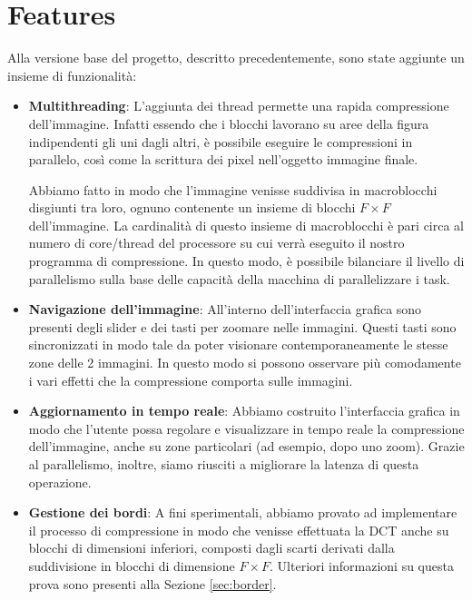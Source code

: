 \section{Features}

Alla versione base del progetto, descritto precedentemente, sono state aggiunte un insieme di funzionalità:

\begin{itemize}
	\item \textbf{Multithreading}: L'aggiunta dei thread permette una rapida compressione dell'immagine. Infatti essendo che i blocchi lavorano su aree della figura indipendenti gli uni dagli altri, è possibile eseguire le compressioni in parallelo, così come la scrittura dei pixel nell'oggetto immagine finale.
	
	Abbiamo fatto in modo che l'immagine venisse suddivisa in macroblocchi disgiunti tra loro, ognuno contenente un insieme di blocchi $F \times F$ dell'immagine. La cardinalità di questo insieme di macroblocchi è pari circa al numero di core/thread del processore su cui verrà eseguito il nostro programma di compressione. In questo modo, è possibile bilanciare il livello di parallelismo sulla base delle capacità della macchina di parallelizzare i task.
	\item \textbf{Navigazione dell'immagine}: All'interno dell'interfaccia grafica sono presenti degli slider e dei tasti per zoomare nelle immagini. Questi tasti sono sincronizzati in modo tale da poter visionare contemporaneamente le stesse zone delle 2 immagini. In questo modo si possono osservare più comodamente i vari effetti che la compressione comporta sulle immagini.
	\item \textbf{Aggiornamento in tempo reale}: Abbiamo costruito l'interfaccia grafica in modo che l'utente possa regolare e visualizzare in tempo reale la compressione dell'immagine, anche su zone particolari (ad esempio, dopo uno zoom). Grazie al parallelismo, inoltre, siamo riusciti a migliorare la latenza di questa operazione.
	\item  \textbf{Gestione dei bordi}:  A fini sperimentali, abbiamo provato ad implementare il processo di compressione in modo che venisse effettuata la DCT anche su blocchi di dimensioni inferiori, composti dagli scarti derivati dalla suddivisione in blocchi di dimensione $ F \times F$. Ulteriori informazioni su questa prova sono presenti alla Sezione \ref{sec:border}.
	
	\end{itemize}

